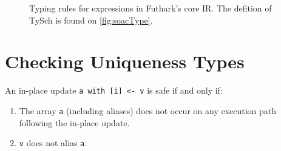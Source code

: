 \begin{figure}[bt]









\caption{Typing rules for expressions in Futhark's core IR.  The
  defition of TySch is found on \cref{fig:soacType}.}
\label{fig:srcTypeRulesExps}

\end{figure}

\FloatBarrier
\section{Checking Uniqueness Types}
\label{sec:uniqueness-formalism}

An in-place update \lstinline{a with [i] <- v} is safe if and only if:

\begin{enumerate}
\item The array \texttt{a} (including aliases) does not occur on any
  execution path following the in-place update.
\item \texttt{v} does not alias \texttt{a}.
\end{enumerate}

